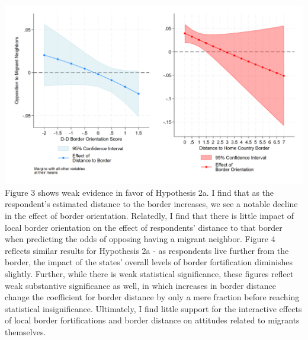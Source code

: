 \documentclass[12pt,]{article}
\begin{document}
\includegraphics{figures/m4_marginal_1.png} Figure 3 shows weak evidence
in favor of Hypothesis 2a. I find that as the respondent's estimated
distance to the border increases, we see a notable decline in the effect
of border orientation. Relatedly, I find that there is little impact of
local border orientation on the effect of respondents' distance to that
border when predicting the odds of opposing having a migrant neighbor.
Figure 4 reflects similar results for Hypothesis 2a - as respondents
live further from the border, the impact of the states' overall levels
of border fortification diminishes slightly. Further, while there is
weak statistical significance, these figures reflect weak substantive
significance as well, in which increases in border distance change the
coefficient for border distance by only a mere fraction before reaching
statistical insignificance. Ultimately, I find little support for the
interactive effects of local border fortifications and border distance
on attitudes related to migrants themselves.
\end{document}
